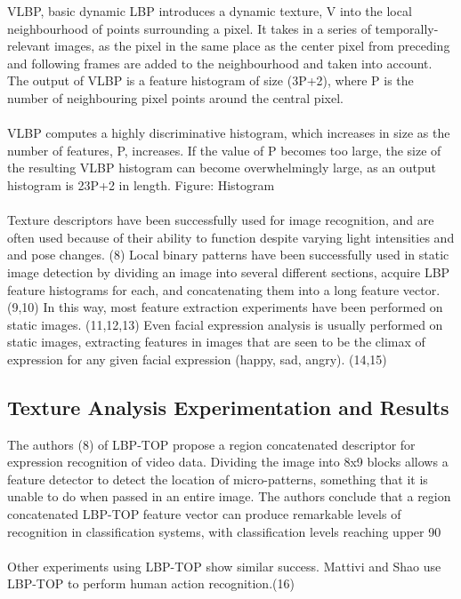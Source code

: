 \documentclass[12pt,twoside]{report}
\begin{document}
VLBP, basic dynamic LBP introduces a dynamic texture, V into the local neighbourhood of points surrounding a pixel. It takes in a series of temporally-relevant images, as the pixel in the same place as the center pixel from preceding and following frames are added to the neighbourhood and taken into account. The output of VLBP is a feature histogram of size (3P+2), where P is the number of neighbouring pixel points around the central pixel. 
\\ \\
VLBP computes a highly discriminative histogram, which increases in size as the number of features, P, increases. If the value of P becomes too large, the size of the resulting VLBP histogram can become overwhelmingly large, as an output histogram is 23P+2 in length.
Figure: Histogram
\\ \\
Texture descriptors have been successfully used for image recognition, and are often used because of their ability to function despite varying light intensities and and pose changes. (8) Local binary patterns have been successfully used in static image detection by dividing an image into several different sections, acquire LBP feature histograms for each, and concatenating them into a long feature vector. (9,10) In this way, most feature extraction experiments have been performed on static images. (11,12,13) Even facial expression analysis is usually performed on static images, extracting features in images that are seen to be the climax of expression for any given facial expression (happy, sad, angry). (14,15)

		\subsection{Texture Analysis Experimentation and Results}
The authors (8) of LBP-TOP propose a region concatenated descriptor for expression recognition of video data. Dividing the image into 8x9 blocks allows a feature detector to detect the location of micro-patterns, something that it is unable to do when passed in an entire image. The authors conclude that a region concatenated LBP-TOP feature vector can produce remarkable levels of recognition in classification systems, with classification levels reaching upper 90%
\\ \\
	Other experiments using LBP-TOP show similar success. Mattivi and Shao use LBP-TOP to perform human action recognition.(16)
\end{document}
